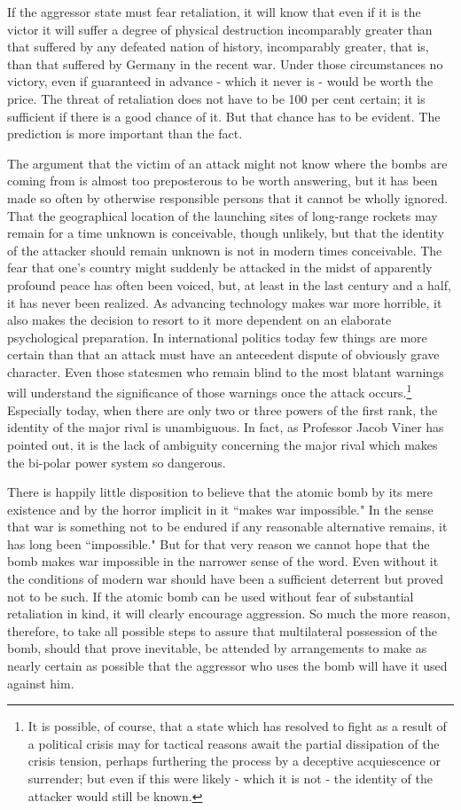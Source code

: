 If the aggressor state must fear retaliation, it will know that even if it is the victor it will suffer a degree of physical destruction incomparably greater than that suffered by any defeated nation of history, incomparably greater, that is, than that suffered by Germany in the recent war. Under those circumstances no victory, even if guaranteed in advance - which it never is - would be worth the price. The threat of retaliation does not have to be 100 per cent certain; it is sufficient if there is a good chance of it. But that chance has to be evident. The prediction is more important than the fact.

The argument that the victim of an attack might not know where the bombs are coming from is almost too preposterous to be worth answering, but it has been made so often by otherwise responsible persons that it cannot be wholly ignored. That the geographical location of the launching sites of long-range rockets may remain for a time unknown is conceivable, though unlikely, but that the identity of the attacker should remain unknown is not in modern times conceivable. The fear that one's country might suddenly be attacked in the midst of apparently profound peace has often been voiced, but, at least in the last century and a half, it has never been realized. As advancing technology makes war more horrible, it also makes the decision to resort to it more dependent on an elaborate psychological preparation. In international politics today few things are more certain than that an attack must have an antecedent dispute of obviously grave character. Even those statesmen who remain blind to the most blatant warnings will understand the significance of those warnings once the attack occurs.\footnote{It is possible, of course, that a state which has resolved to fight as a result of a political crisis may for tactical reasons await the partial dissipation of the crisis tension, perhaps furthering the process by a deceptive acquiescence or surrender; but even if this were likely - which it is not - the identity of the attacker would still be known.} Especially today, when there are only two or three powers of the first rank, the identity of the major rival is unambiguous. In fact, as Professor Jacob Viner has pointed out, it is the lack of ambiguity concerning the major rival which makes the bi-polar power system so dangerous.

There is happily little disposition to believe that the atomic bomb by its mere existence and by the horror implicit in it ``makes war impossible." In the sense that war is something not to be endured if any reasonable alternative remains, it has long been ``impossible." But for that very reason we cannot hope that the bomb makes war impossible in the narrower sense of the word. Even without it the conditions of modern war should have been a sufficient deterrent but proved not to be such. If the atomic bomb can be used without fear of substantial retaliation in kind, it will clearly encourage aggression. So much the more reason, therefore, to take all possible steps to assure that multilateral possession of the bomb, should that prove inevitable, be attended by arrangements to make as nearly certain as possible that the aggressor who uses the bomb will have it used against him.

